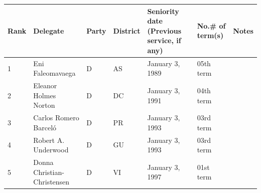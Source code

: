\documentclass{article}
\begin{document}
\begin{tabular}{lllllll}
\toprule
Rank & Delegate & Party & District & Seniority date (Previous service, if any) & No.\# of term(s) & Notes \\
\midrule
1 & Eni Faleomavaega & D & AS & January 3, 1989 & 05th term &  \\
2 & Eleanor Holmes Norton & D & DC & January 3, 1991 & 04th term &  \\
3 & Carlos Romero Barceló & D & PR & January 3, 1993 & 03rd term &  \\
4 & Robert A. Underwood & D & GU & January 3, 1993 & 03rd term &  \\
5 & Donna Christian-Christensen & D & VI & January 3, 1997 & 01st term &  \\
\bottomrule
\end{tabular}
\end{document}
